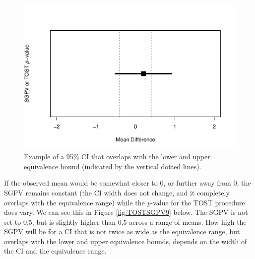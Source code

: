\documentclass[
  english,
  man]{apa6}
\begin{document}
\begin{figure}

{\centering \includegraphics[height=0.94\textheight]{chp5_format-Rmd_bib_files/figure-latex/TOSTSGPV8-1} 

}

\caption{Example of a 95$\%$ CI that overlaps with the lower and upper equivalence bound (indicated by the vertical dotted lines).}\label{fig:TOSTSGPV8}
\end{figure}

If the observed mean would be somewhat closer to 0, or further away from 0, the SGPV remains constant (the CI width does not change, and it completely overlaps with the equivalence range) while the \emph{p}-value for the TOST procedure does vary. We can see this in Figure \ref{fig:TOSTSGPV9} below. The SGPV is not set to 0.5, but is slightly higher than 0.5 across a range of means. How high the SGPV will be for a CI that is not twice as wide as the equivalence range, but overlaps with the lower and upper equivalence bounds, depends on the width of the CI and the equivalence range.
\end{document}
